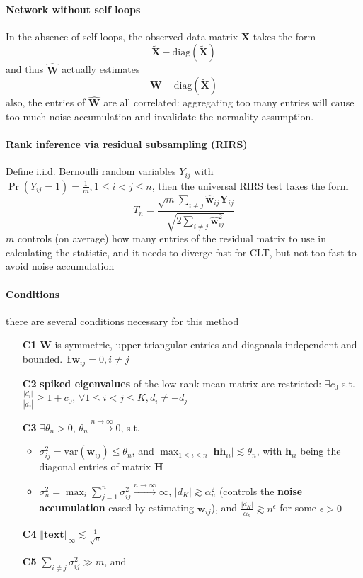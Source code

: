 \documentclass[twoside]{article}
\begin{document}
\paragraph*{Network without self loops} In the absence of self loops, the observed data matrix $\mathbf{X}$ takes the form $$ \tilde{\mathbf{X}} - \mathrm{diag}\left(\tilde{\mathbf{X}}\right) $$ and thus $\hat{\mathbf{W}}$ actually estimates $$\mathbf{W} - \mathrm{diag}\left(\tilde{\mathbf{X}}\right)$$
also, the entries of $\hat{\mathbf{W}}$ are all correlated: aggregating too many entries will cause too much noise accumulation and invalidate the normality assumption.

\paragraph*{Rank inference via residual subsampling (RIRS)} Define i.i.d. Bernoulli random variables $Y_{ij}$ with $ \Pr \left(Y_{ij}=1\right) = \frac{1}{m},1\leq i<j \leq n$, then the universal RIRS test takes the form 
$$ 
T_n = \frac{\sqrt{m} \sum_{i\neq j}\hat{\mathbf{w}}_{ij}\mathbf{Y}_{ij}}{\sqrt{2\sum_{i\neq j}\hat{\mathbf{w}}^2_{ij}}}
$$
$m$ controls (on average) how many entries of the residual matrix to use in calculating the statistic,  and it needs to diverge fast for CLT, but not too fast to avoid noise accumulation

\paragraph*{Conditions} there are several conditions necessary for this method
\begin{itemize}
    \item[\textbf{C1}] $\mathbf{W}$ is symmetric, upper triangular entries and diagonals independent and bounded. $\mathbb{E}\mathbf{w}_{ij}=0,i\neq j$
    \item[\textbf{C2}] \textbf{spiked eigenvalues} of the low rank mean matrix are restricted: $\exists c_0$ s.t. $\frac{\left\vert d_i \right\vert }{\left\vert d_j \right\vert}\geq 1+c_0$, $\forall 1\leq i<j \leq K, d_i\neq -d_j$
    \item[\textbf{C3}] $\exists \theta_n>0$, $\theta_n\xrightarrow{n\rightarrow\infty} 0$, s.t. 
    \begin{itemize}
        \item $\sigma^2_{ij}=\mathrm{var}(\mathbf{w}_{ij})\leq \theta_n$, and $\max_{1\leq i\leq n}\left\vert \mathbf{hh}_{ii} \right\vert \lesssim \theta_n $, with $\mathbf{h}_{ii}$ being the diagonal entries of matrix $\mathbf{H}$
        \item $\sigma^2_n = \max_i \sum^n_{j=1}\sigma^2_{ij}\xrightarrow{n\rightarrow\infty}\infty$, $\left\vert d_K \right\vert \gtrsim \alpha^2_n $ (controls the \textbf{noise accumulation} cased by estimating $\mathbf{w}_{ij}$), and $\frac{\left\vert d_K \right\vert}{\alpha_n}\gtrsim n^{\epsilon}$ for some $\epsilon>0$
    \end{itemize}
    \item[\textbf{C4}] $\left\Vert \mathbf{text} \right\Vert _{\infty} \lesssim \frac{1}{\sqrt{n}}$
    \item[\textbf{C5}] $\sum_{i\neq j}\sigma^2_{ij}\gg m$, and 
\end{itemize}

\newpage


\end{document}
